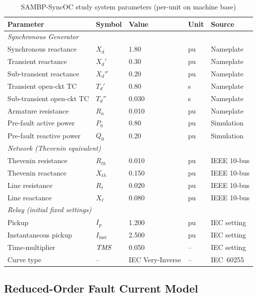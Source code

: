 \begin{table}[htbp]
\caption{SAMBP-SyncOC study system parameters (per-unit on machine base)}
\label{tab:ch5_sysparams}
\small
\begin{tabularx}{\textwidth}{@{}lllll@{}}
\toprule
Parameter & Symbol & Value & Unit & Source \\
\midrule
\multicolumn{5}{l}{\textit{Synchronous Generator}} \\
Synchronous reactance & $X_d$ & 1.80 & pu & Nameplate \\
Transient reactance & $X_d'$ & 0.30 & pu & Nameplate \\
Sub-transient reactance & $X_d''$ & 0.20 & pu & Nameplate \\
Transient open-ckt TC & $T_d'$ & 0.80 & s & Nameplate \\
Sub-transient open-ckt TC & $T_d''$ & 0.030 & s & Nameplate \\
Armature resistance & $R_a$ & 0.010 & pu & Nameplate \\
Pre-fault active power & $P_0$ & 0.80 & pu & Simulation \\
Pre-fault reactive power & $Q_0$ & 0.20 & pu & Simulation \\
\midrule
\multicolumn{5}{l}{\textit{Network (Thevenin equivalent)}} \\
Thevenin resistance & $R_{th}$ & 0.010 & pu & IEEE 10-bus \\
Thevenin reactance & $X_{th}$ & 0.150 & pu & IEEE 10-bus \\
Line resistance & $R_\ell$ & 0.020 & pu & IEEE 10-bus \\
Line reactance & $X_\ell$ & 0.080 & pu & IEEE 10-bus \\
\midrule
\multicolumn{5}{l}{\textit{Relay (initial fixed settings)}} \\
Pickup & $I_p$ & 1.200 & pu & IEC setting \\
Instantaneous pickup & $I_\mathrm{inst}$ & 2.500 & pu & IEC setting \\
Time-multiplier & $\mathit{TMS}$ & 0.050 & -- & IEC setting \\
Curve type & -- & IEC Very-Inverse & -- & IEC~60255 \\
\bottomrule
\end{tabularx}
\end{table}

\subsection{Reduced-Order Fault Current Model}

